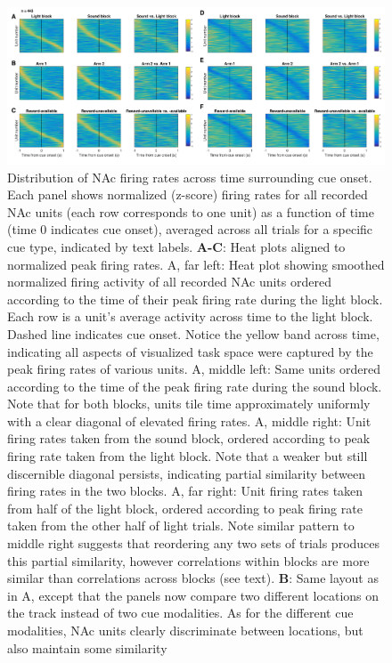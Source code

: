 \documentclass[11pt]{article}
\newcommand{\bsf}[1]{\textbf{#1}}
\begin{document}
{\begin{figure}[h]
\centering
\includegraphics[height=0.5\textheight]{Fig 8 - Task tiling.png}
\caption{Distribution of NAc firing rates across time surrounding cue
  onset. Each panel shows normalized (z-score) firing rates for all recorded NAc
  units (each row corresponds to one unit) as a function of time (time 0
  indicates cue onset), averaged across all trials for a specific cue type,
  indicated by text labels. \bsf{A-C}: Heat plots aligned to normalized peak
  firing rates. A, far left: Heat plot showing smoothed normalized firing
  activity of all recorded NAc units ordered according to the time of their peak
  firing rate during the light block. Each row is a unit’s average activity
  across time to the light block. Dashed line indicates cue onset. Notice the
  yellow band across time, indicating all aspects of visualized task space were
  captured by the peak firing rates of various units. A, middle left: Same units
  ordered according to the time of the peak firing rate during the sound
  block. Note that for both blocks, units tile time approximately uniformly with
  a clear diagonal of elevated firing rates. A, middle right: Unit firing rates
  taken from the sound block, ordered according to peak firing rate taken from
  the light block. Note that a weaker but still discernible diagonal persists,
  indicating partial similarity between firing rates in the two blocks. A, far
  right: Unit firing rates taken from half of the light block, ordered according
  to peak firing rate taken from the other half of light trials. Note similar
  pattern to middle right suggests that reordering any two sets of trials
  produces this partial similarity, however correlations within blocks are more
  similar than correlations across blocks (see text). \bsf{B}: Same layout as in
  A, except that the panels now compare two different locations on the track
  instead of two cue modalities. As for the different cue modalities, NAc units
  clearly discriminate between locations, but also maintain some similarity
}
\end{figure}}
\end{document}
